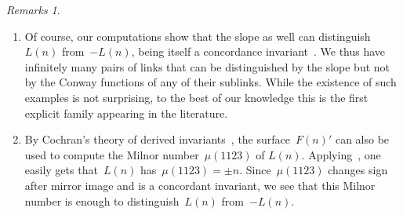 \documentclass{amsart}
\theoremstyle{definition}
\theoremstyle{remark}
\newtheorem{rems}[thm]{Remarks}
\begin{document}
\begin{rems}\label{rems:example}
	\begin{enumerate}
		\item Of course, our computations show that the slope as well can distinguish~$L(n)$ from~$-L(n)$, being itself a concordance invariant~\cite{DFL3}. We thus have infinitely many pairs of links that can be distinguished by the slope but not by the Conway functions of any of their sublinks. While the existence of such examples is not surprising, to the best of our knowledge this is the first explicit family appearing in the literature.
		
		\item By Cochran's theory of derived invariants~\cite{Coc90}, the surface~$F(n)'$ can also be used to compute the Milnor number~$\mu(1123)$ of $L(n)$. Applying~\cite[Proposition 6.5]{Coc90}, one easily gets that~$L(n)$ has~$\mu(1123) = \pm n$. Since~$\mu(1123)$ changes sign after mirror image and is a concordant invariant, we see that this Milnor number is enough to distinguish~$L(n)$ from~$-L(n)$.
	\end{enumerate}
\end{rems}
  


	
\end{document}
